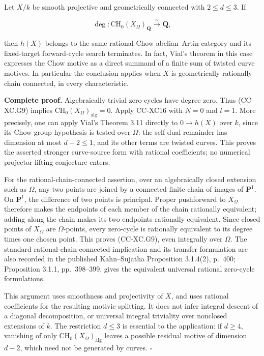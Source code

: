 Let \(X/k\) be smooth projective and geometrically connected with
\(2\le d\le3\). If

\[
              \deg:\mathrm{CH}_0(X_\Omega)_{\mathbf Q}
                         \xrightarrow{\ \sim\ }\mathbf Q ,
 \tag{CC-XC.G9}
\]

then \(h(X)\) belongs to the same rational Chow abelian--Artin category
and its fixed-target forward-cycle search terminates. In fact, Vial's
theorem in this case expresses the Chow motive as a direct summand of a
finite sum of twisted curve motives. In particular the conclusion
applies when \(X\) is geometrically rationally chain connected, in every
characteristic.

\textbf{Complete proof.} Algebraically trivial zero-cycles have degree
zero. Thus (CC-XC.G9) implies
\(\mathrm{CH}_0(X_\Omega)_{\mathrm{alg}}=0\). Apply CC-XC16 with \(N=0\)
and \(l=1\). More precisely, one can apply Vial's Theorem 3.11 directly
to \(0\to h(X)\) over \(k\), since its Chow-group hypothesis is tested
over \(\Omega\): the self-dual remainder has dimension at most
\(d-2\le1\), and its other terms are twisted curves. This proves the
asserted stronger curve-source form with rational coefficients; no
numerical projector-lifting conjecture enters.

For the rational-chain-connected assertion, over an algebraically closed
extension such as \(\Omega\), any two points are joined by a connected
finite chain of images of \(\mathbf P^1\). On \(\mathbf P^1\), the
difference of two points is principal. Proper pushforward to
\(X_\Omega\) therefore makes the endpoints of each member of the chain
rationally equivalent; adding along the chain makes its two endpoints
rationally equivalent. Since closed points of \(X_\Omega\) are
\(\Omega\)-points, every zero-cycle is rationally equivalent to its
degree times one chosen point. This proves (CC-XC.G9), even integrally
over \(\Omega\). The standard rational-chain-connected implication and
its transfer formulation are also recorded in the published
Kahn--Sujatha Proposition 3.1.4(2), p.~400; Proposition 3.1.1,
pp.~398--399, gives the equivalent universal rational zero-cycle
formulations.

This argument uses smoothness and projectivity of \(X\), and uses
rational coefficients for the resulting motivic splitting. It does not
infer integral descent of a diagonal decomposition, or universal
integral triviality over nonclosed extensions of \(k\). The restriction
\(d\le3\) is essential to the application: if \(d\ge4\), vanishing of
only \(\mathrm{CH}_0(X_\Omega)_{\mathrm{alg}}\) leaves a possible
residual motive of dimension \(d-2\), which need not be generated by
curves. \(\square\)

